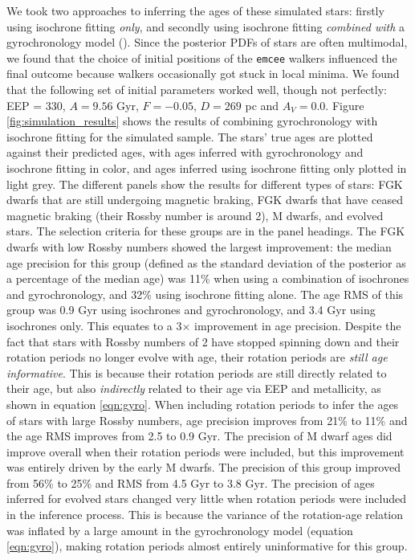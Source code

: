 We took two approaches to inferring the ages of these simulated stars:
firstly using isochrone fitting {\it only}, and secondly using isochrone
fitting {\it combined with} a gyrochronology model (\sd).
Since the posterior PDFs of stars are often multimodal, we found that the
choice of initial positions of the {\tt emcee} walkers influenced the final
outcome because walkers occasionally got stuck in local minima.
We found that the following set of initial parameters worked well, though not
perfectly: EEP = 330, $A = 9.56$ Gyr, $F = -0.05$, $D = 269$ pc and $A_V =
0.0$.
Figure \ref{fig:simulation_results} shows the results of combining
gyrochronology with isochrone fitting for the simulated sample.
The stars' true ages are plotted against their predicted ages, with ages
inferred with gyrochronology and isochrone fitting
in color, and ages inferred using isochrone fitting only plotted in light
grey.
The different panels show the results for different types of stars: FGK
dwarfs that are still undergoing magnetic braking, FGK dwarfs that have ceased
magnetic braking (their Rossby number is around 2), M dwarfs, and evolved
stars.
The selection criteria for these groups are in the panel headings.
The FGK dwarfs with low Rossby numbers showed the largest improvement: the
median age precision for this group (defined as the standard deviation of the
posterior as a percentage of the median age) was 11\% when using a combination
of isochrones and gyrochronology, and 32\% using isochrone fitting alone.
The age RMS of this group was 0.9 Gyr using isochrones and gyrochronology, and
3.4 Gyr using isochrones only.
This equates to a 3$\times$ improvement in age precision.
Despite the fact that stars with Rossby numbers of 2 have stopped spinning
down and their rotation periods no longer evolve with age, their rotation
periods are {\it still age informative}.
This is because their rotation periods are still directly related to their
age, but also {\it indirectly} related to their age via EEP and metallicity,
as shown in equation \ref{eqn:gyro}.
When including rotation periods to infer the ages of stars with large Rossby
numbers, age precision improves from 21\% to 11\% and the age RMS improves
from 2.5 to 0.9 Gyr.
The precision of M dwarf ages did improve overall when their rotation periods
were included, but this improvement was entirely driven by the early M dwarfs.
The precision of this group improved from 56\% to 25\% and RMS from 4.5 Gyr
to 3.8 Gyr.
The precision of ages inferred for evolved stars changed very little when
rotation periods were included in the inference process.
This is because the variance of the rotation-age relation was inflated by a
large amount in the gyrochronology model (equation \ref{eqn:gyro}), making
rotation periods almost entirely uninformative for this group.

